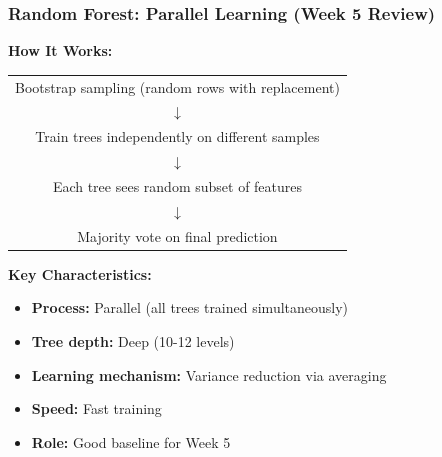 \documentclass{beamer}
\begin{document}
\begin{frame}[fragile]
\frametitle{Random Forest: Parallel Learning (Week 5 Review)}

\textbf{How It Works:}

\begin{center}
\begin{tabular}{c}
Bootstrap sampling (random rows with replacement) \\
$\downarrow$ \\
Train trees independently on different samples \\
$\downarrow$ \\
Each tree sees random subset of features \\
$\downarrow$ \\
Majority vote on final prediction \\
\end{tabular}
\end{center}

\vspace{0.4cm}
\textbf{Key Characteristics:}

\begin{itemize}
    \item \textbf{Process:} Parallel (all trees trained simultaneously)
    \item \textbf{Tree depth:} Deep (10-12 levels)
    \item \textbf{Learning mechanism:} Variance reduction via averaging
    \item \textbf{Speed:} Fast training
    \item \textbf{Role:} Good baseline for Week 5
\end{itemize}

\end{frame}
\end{document}
